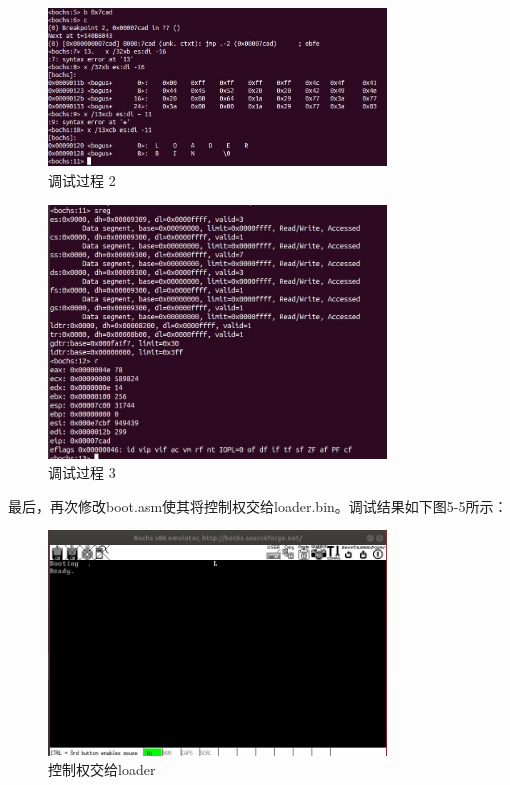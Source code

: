 \begin{figure}[H]
  \centering
  \includegraphics[width=0.8\textwidth]{figures/chapter5/5-3.jpg}
  \caption{调试过程 2}
  \label{fig:3}
\end{figure}

\begin{figure}[H]
  \centering
  \includegraphics[width=0.8\textwidth]{figures/chapter5/5-4.jpg}
  \caption{调试过程 3}
  \label{fig:4}
\end{figure}

最后，再次修改boot.asm使其将控制权交给loader.bin。调试结果如下图5-5所示：
\begin{figure}[H]
  \centering
  \includegraphics[width=0.8\textwidth]{figures/chapter5/5-5.jpg}
  \caption{控制权交给loader}
  \label{fig:5}
\end{figure}

